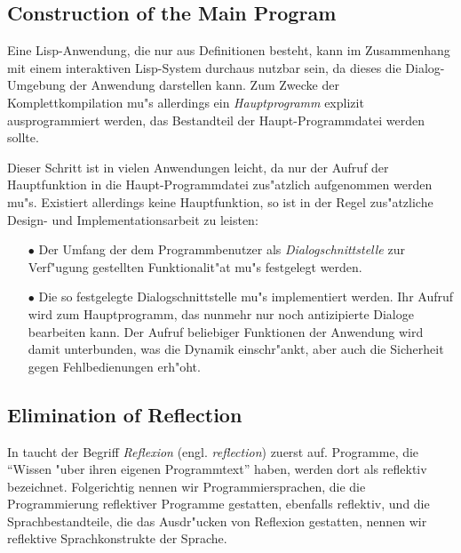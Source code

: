 \subsection{Construction of the Main Program}
\label{mainprog}

Eine Lisp-Anwendung, die nur aus Definitionen besteht, kann im
Zusammenhang mit einem interaktiven Lisp-System durchaus nutzbar
sein, da dieses die Dialog-Umgebung der Anwendung darstellen kann. Zum
Zwecke der Komplettkompilation mu"s allerdings ein {\em Hauptprogramm}
explizit ausprogrammiert werden, das Bestandteil der
Haupt-Programmdatei werden sollte.

Dieser Schritt ist in vielen Anwendungen leicht, da nur der Aufruf der
Hauptfunktion in die Haupt-Programmdatei zus"atzlich aufgenommen
werden mu"s. Existiert allerdings keine Hauptfunktion, so ist in der
Regel zus"atzliche Design- und Implementationsarbeit zu leisten:

\begin{itemize}
\item[$\bullet$] Der Umfang der dem Programmbenutzer als {\em
Dialogschnittstelle} zur Verf"ugung gestellten Funktionalit"at mu"s
festgelegt werden. 
\item[$\bullet$] Die so festgelegte Dialogschnittstelle mu"s
implementiert werden. Ihr Aufruf wird zum Hauptprogramm, das nunmehr
nur noch antizipierte Dialoge bearbeiten kann. Der Aufruf beliebiger
Funktionen der Anwendung wird damit unterbunden, was die Dynamik
einschr"ankt, aber auch die Sicherheit gegen Fehlbedienungen erh"oht.
\end{itemize}

\subsection{Elimination of Reflection}

In \cite{Smith82} \cite{Smith84} taucht der Begriff {\em Reflexion}
(engl. {\em reflection}) zuerst auf. Programme, die "`Wissen "uber
ihren eigenen Programmtext"' haben, werden dort als reflektiv
bezeichnet. Folgerichtig nennen wir Programmiersprachen, die die
Programmierung reflektiver Programme gestatten, ebenfalls reflektiv,
und die Sprachbestandteile, die das Ausdr"ucken von Reflexion
gestatten, nennen wir reflektive Sprachkonstrukte der Sprache.

